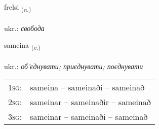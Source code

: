 \documentclass[frontgrid, backgrid]{flacards}\usepackage[]{graphicx}\usepackage[]{xcolor}
\begin{document}
\renewcommand{\flhead}{\vskip5pt \fboxsep=0pt {\small\bfseries\footnotesize Nafnorð | іменник}}
\renewcommand{\fcfoot}{\vskip5pt \fboxsep=0pt \hspace{2pt}{\small\bfseries\footnotesize 2K}}

\renewcommand{\blhead}{\vskip5pt {\small\bfseries\footnotesize Nafnorð | іменник }}
\renewcommand{\bcfoot}{\vskip5pt \hspace{2pt}{\small\bfseries\footnotesize 2K}}


{frelsi \small{\textsubscript{(\textit{n.})}} \\[1ex] %
\textphonetic{[frɛlsɪ]} \\
ukr.: \emph{свобода} \\  [2ex]
\renewcommand*{\arraystretch}{0.8}
}

\renewcommand{\flhead}{\vskip5pt \fboxsep=0pt {\small\bfseries\footnotesize Sagnorð | дієслово}}
\renewcommand{\fcfoot}{\vskip5pt \fboxsep=0pt \hspace{2pt}{\small\bfseries\footnotesize 2K}}

\renewcommand{\blhead}{\vskip5pt {\small\bfseries\footnotesize Sagnorð | дієслово }}
\renewcommand{\bcfoot}{\vskip5pt \hspace{2pt}{\small\bfseries\footnotesize 2K}}


{sameina \small{\textsubscript{(\textit{v.})}} \\[1ex] %
\textphonetic{[saːmeina]} \\
ukr.: \emph{об’єднувати; приєднувати; поєднувати} \\  [2ex]
\renewcommand*{\arraystretch}{0.8}
\begin{tabular}{p{1cm}l}
\textsc{1sg}: & sameina -- sameinaði -- sameinað \\ 
\textsc{2sg}: & sameinar -- sameinaðir -- sameinað \\ 
\textsc{3sg}: & sameinar -- sameinaði -- sameinað \\ 
\end{tabular}
}
\end{document}

